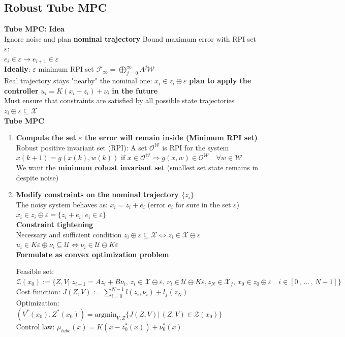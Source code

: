 \subsection{Robust Tube MPC}
\textbf{Tube MPC: Idea}\\
Ignore noise and plan \textbf{nominal trajectory}
\rightarrow Bound maximum error with RPI set $\varepsilon$:\\
$e_i\in\varepsilon\rightarrow e_{i+1}\in\varepsilon$\\
\textbf{Ideally}: $\varepsilon$ minimum RPI set $\mathcal{F}_\infty=\bigoplus_{j=0}^\infty A^j\mathcal{W}$\\
Real trajectory stays "nearby" the nominal one: $x_i\in z_i\oplus\varepsilon$ \rightarrow \textbf{plan to apply the controller}  $u_i=K(x_i-z_i)+\nu_i$ \textbf{in the future}\\
\rightarrow Must ensure that constraints are satisfied by all possible state trajectories $z_i\oplus\varepsilon\subseteq\mathcal{X}$\\
\textbf{Tube MPC}
\begin{enumerate}
    \item \textbf{Compute the set $\varepsilon$ the error will remain inside (Minimum RPI set)}\\
    Robust positive invariant set (RPI): A set $\mathcal{O}^\mathcal{W}$ is RPI for the system $x(k+1)=g(x(k),w(k))$ if $x\in\mathcal{O}^\mathcal{W}\Rightarrow g(x,w)\in\mathcal{O}^\mathcal{W}\quad\forall w\in\mathcal{W}$\\
    We want the \textbf{minimum robust invariant set} (smallest set state remains in despite noise)
    \item \textbf{Modify constraints on the nominal trajectory $\{z_i\}$}\\
    The noisy system behaves as: $x_i=z_i+e_i$ (error $e_i$ for sure in the set $\varepsilon$)\\
    $x_i\in z_i\oplus\varepsilon=\{z_i+e_i|\;e_i\in\varepsilon\}$\\
    \textbf{Constraint tightening}\\
    Necessary and sufficient condition $z_i\oplus\varepsilon\subseteq\mathcal{X}\Leftrightarrow z_i\in\mathcal{X}\ominus\varepsilon$\\
    $u_i\in K\varepsilon\oplus\nu_i\subseteq\mathcal{U}\Leftrightarrow\nu_i\in\mathcal{U}\ominus K\varepsilon$\\
    \textbf{Formulate as convex optimization problem}\\
    \begin{tcolorbox}[eqbox]
    Feasible set: $\mathcal{Z}(x_0):=\{Z,V|\;z_{i+1}=Az_i+B\nu_i,\,z_i\in\mathcal{X}\ominus\varepsilon,\,\nu_i\in\mathcal{U}\ominus K\varepsilon,z_N\in\mathcal{X}_f,\,x_0\in z_0\oplus\varepsilon\quad i\in[0\,,\,...\,,\,N-1]\}$\\
    Cost function: $J(Z,V):=\sum_{i=0}^{N-1}l(z_i,\nu_i)+l_f(z_N)$\\
    Optimization: $(V^*(x_0),Z^*(x_0))=\text{argmin}_{V,Z}\{J(Z,V)|\,(Z,V)\in\mathcal{Z}(x_0)\}$\\
    Control law: $\mu_{tube}(x)=K(x-z_0^*(x))+\nu_0^*(x)$
    \end{tcolorbox}
\end{enumerate}

